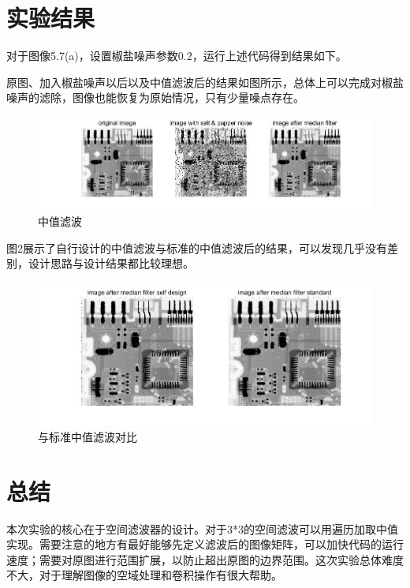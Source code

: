 \documentclass[12pt]{article}
\begin{document}
	\section{实验结果}
	对于图像5.7(a)，设置椒盐噪声参数0.2，运行上述代码得到结果如下。
	
	原图、加入椒盐噪声以后以及中值滤波后的结果如图所示，总体上可以完成对椒盐噪声的滤除，图像也能恢复为原始情况，只有少量噪点存在。
	\begin{figure}[H]
		\centering
		\includegraphics[width=0.9\linewidth]{figures/r1}
		\caption{中值滤波}
	\end{figure}
	
	图2展示了自行设计的中值滤波与标准的中值滤波后的结果，可以发现几乎没有差别，设计思路与设计结果都比较理想。
	\begin{figure}[H]
		\centering
		\includegraphics[width=0.7\linewidth]{figures/r2}
		\caption{与标准中值滤波对比}
	\end{figure}
	\section{总结}
	本次实验的核心在于空间滤波器的设计。对于3*3的空间滤波可以用遍历加取中值实现。需要注意的地方有最好能够先定义滤波后的图像矩阵，可以加快代码的运行速度；需要对原图进行范围扩展，以防止超出原图的边界范围。这次实验总体难度不大，对于理解图像的空域处理和卷积操作有很大帮助。
\end{document}
